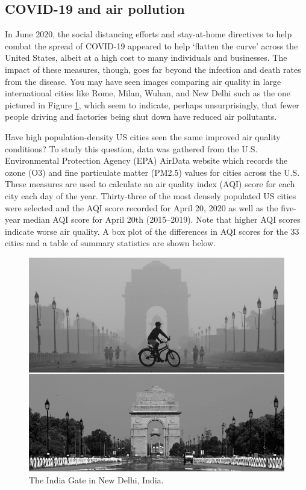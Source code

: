 \documentclass[
]{report}
\begin{document}
\hypertarget{covid-19-and-air-pollution}{%
\subsection{COVID-19 and air pollution}\label{covid-19-and-air-pollution}}

In June 2020, the social distancing efforts and stay-at-home directives to help combat the spread of COVID-19 appeared to help `flatten the curve' across the United States, albeit at a high cost to many individuals and businesses. The impact of these measures, though, goes far beyond the infection and death rates from the disease. You may have seen images comparing air quality in large international cities like Rome, Milan, Wuhan, and New Delhi such as the one pictured in Figure \ref{fig:covid}, which seem to indicate, perhaps unsurprisingly, that fewer people driving and factories being shut down have reduced air pollutants.

Have high population-density US cities seen the same improved air quality conditions? To study this question, data was gathered from the U.S. Environmental Protection Agency (EPA) AirData website which records the ozone (O3) and fine particulate matter (PM2.5) values for cities across the U.S. These measures are used to calculate an air quality index (AQI) score for each city each day of the year. Thirty-three of the most densely populated US cities were selected and the AQI score recorded for April 20, 2020 as well as the five-year median AQI score for April 20th (2015--2019). Note that higher AQI scores indicate worse air quality. A box plot of the differences in AQI scores for the 33 cities and a table of summary statistics are shown below.

\begin{figure}

{\centering \includegraphics[width=0.6\linewidth]{images/air_pollution_greyscale} 

}

\caption{The India Gate in New Delhi, India.}\label{fig:covid}
\end{figure}
\end{document}
